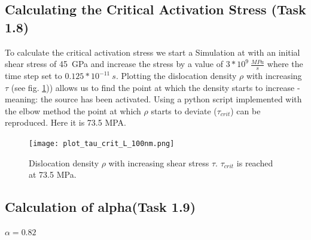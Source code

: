\subsection{Calculating the Critical Activation Stress (Task 1.8)}
To calculate the critical activation stress we start a Simulation at with an initial shear stress of 45~GPa and increase the stress by a value of \(3*10^{9}~\frac{MPa}{s}\) where the time step set to \(0.125*10^{-11}~s\). Plotting the dislocation density \(\rho\) with increasing \(\tau\) (see fig. \ref{fig:tau_vs_rho})) allows us to find the point at which the density starts to increase - meaning: the source has been activated. Using a python script implemented with the elbow method the point at which \(\rho\) starts to deviate (\(\tau_{crit}\)) can be reproduced. Here it is 73.5 MPA.

\begin{figure}[htb]
	\centering
	\texttt{[image: plot\_tau\_crit\_L\_100nm.png]}
	\caption{Dislocation density \(\rho\) with increasing shear stress \(\tau\). \(\tau_{crit}\) is reached at 73.5 MPa. }
	\label{fig:tau_vs_rho}	
\end{figure}

\subsection{Calculation of alpha(Task 1.9)}

\(\alpha = 0.82\)

\printbibliography


